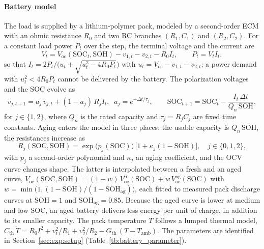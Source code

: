 \paragraph{Battery model}
The load is supplied by a lithium-polymer pack, modeled by a second-order \ac{ECM}
with an ohmic resistance $R_0$ and two RC branches $(R_1, C_1)$ and $(R_2, C_2)$. For a
constant load power $P_t$ over the step, the terminal voltage and the current are
\begin{equation}
  V_t = V_{\mathrm{oc}}(\mathrm{SOC}_t, \mathrm{SOH}) - v_{1,t} - v_{2,t} - R_0 I_t,
  \qquad P_t = V_t I_t,
  \label{eq:ecm}
\end{equation}
so that $I_t = 2P_t / \big(u_t + \sqrt{u_t^2 - 4 R_0 P_t}\big)$ with
$u_t = V_{\mathrm{oc}} - v_{1,t} - v_{2,t}$; a power demand with $u_t^2 < 4R_0P_t$ cannot be
delivered by the battery. The polarization voltages and the \ac{SOC} evolve as
\begin{equation}
  v_{j,t+1} = a_j\, v_{j,t} + (1 - a_j)\, R_j I_t,\;\; a_j = e^{-\Delta t/\tau_j},
  \qquad
  \mathrm{SOC}_{t+1} = \mathrm{SOC}_t - \frac{I_t\,\Delta t}{Q_n\,\mathrm{SOH}},
  \label{eq:soc}
\end{equation}
for $j \in \{1, 2\}$, where $Q_n$ is the rated capacity and $\tau_j = R_j C_j$ are fixed time
constants. Aging enters the model in three places: the usable capacity is $Q_n\,\mathrm{SOH}$, the
resistances increase as
\begin{equation}
  R_j(\mathrm{SOC}, \mathrm{SOH}) = \exp\!\big(p_j(\mathrm{SOC})\big)\,\big[1 + \kappa_j (1 - \mathrm{SOH})\big],
  \quad j \in \{0, 1, 2\},
  \label{eq:ecm_param}
\end{equation}
with $p_j$ a second-order polynomial and $\kappa_j$ an aging coefficient, and the \ac{OCV} curve
changes shape. The latter is interpolated between a fresh and an aged curve,
$V_{\mathrm{oc}}(\mathrm{SOC}, \mathrm{SOH}) = (1 - w)\,V^{\mathrm{fr}}_{\mathrm{oc}}(\mathrm{SOC}) + w\,V^{\mathrm{ag}}_{\mathrm{oc}}(\mathrm{SOC})$
with $w = \min\!\big(1, (1 - \mathrm{SOH}) / (1 - \mathrm{SOH}_{\mathrm{ag}})\big)$, each fitted
to measured pack discharge curves at $\mathrm{SOH} = 1$ and $\mathrm{SOH}_{\mathrm{ag}} = 0.85$.
Because the aged curve is lower at medium and low \ac{SOC}, an aged battery delivers less energy
per unit of charge, in addition to its smaller capacity. The pack temperature $T$ follows a lumped
thermal model,
$C_{\mathrm{th}}\,\dot T = R_0 I^2 + v_1^2/R_1 + v_2^2/R_2 - G_{\mathrm{th}}\,(T - T_{\mathrm{amb}})$.
The parameters are identified in Section~\ref{sec:exp:setup} (Table~\ref{tb:battery_parameter}).

